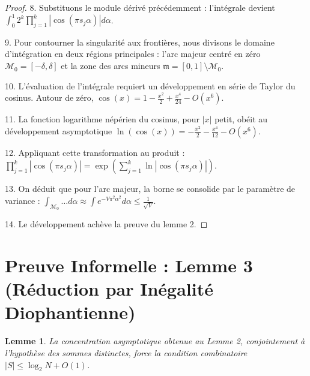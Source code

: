 \documentclass[11pt,a4paper]{article}
\newtheorem{lemma}[theorem]{Lemme}
\begin{document}
\begin{proof}
8. Substituons le module dérivé précédemment : l'intégrale devient $\int_{0}^{1} 2^k \prod_{j=1}^k |\cos(\pi s_j \alpha)| d\alpha$.

9. Pour contourner la singularité aux frontières, nous divisons le domaine d'intégration en deux régions principales : l'arc majeur centré en zéro $\mathcal{M}_0 = [-\delta, \delta]$ et la zone des arcs mineurs $\mathfrak{m} = [0, 1] \setminus \mathcal{M}_0$.

10. L'évaluation de l'intégrale requiert un développement en série de Taylor du cosinus. Autour de zéro, $\cos(x) = 1 - \frac{x^2}{2} + \frac{x^4}{24} - O(x^6)$.

11. La fonction logarithme népérien du cosinus, pour $|x|$ petit, obéit au développement asymptotique $\ln(\cos(x)) = -\frac{x^2}{2} - \frac{x^4}{12} - O(x^6)$.

12. Appliquant cette transformation au produit : $\prod_{j=1}^k |\cos(\pi s_j \alpha)| = \exp \left( \sum_{j=1}^k \ln |\cos(\pi s_j \alpha)| \right)$.

13. On déduit que pour l'arc majeur, la borne se consolide par le paramètre de variance : $\int_{\mathcal{M}_0} \dots d\alpha \approx \int e^{-V \pi^2 \alpha^2} d\alpha \le \frac{1}{\sqrt{V}}$.

14. Le développement achève la preuve du lemme 2.
\end{proof}

\newpage
\section{Preuve Informelle : Lemme 3 (Réduction par Inégalité Diophantienne)}
\begin{lemma}
La concentration asymptotique obtenue au Lemme 2, conjointement à l'hypothèse des sommes distinctes, force la condition combinatoire $|S| \le \log_2 N + O(1)$.
\end{lemma}
\end{document}
